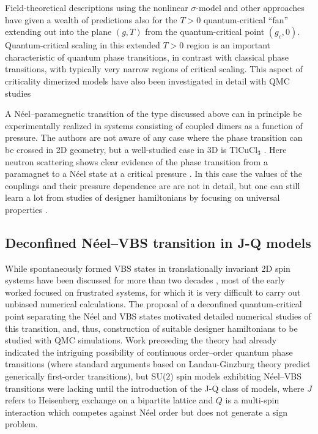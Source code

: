 \documentclass[range]{ar2e}
\begin{document}
Field-theoretical descriptions using the nonlinear $\sigma$-model \cite{Haldane83,Chakravarty89,Chubukov94} and other approaches have given a wealth of 
predictions also for the $T>0$ quantum-critical ``fan'' extending out into the plane $(g,T)$  from the quantum-critical point $(g_c,0)$. Quantum-critical
scaling in this extended $T>0$ region is an important characteristic of quantum phase transitions, in contrast with classical phase transitions, with typically 
very narrow regions of critical scaling. This aspect of criticality dimerized models have also been investigated in detail with QMC studies \cite{Sandvik95,Brenig06,Sandvik11a}

A N\'eel--paramegnetic transition of the type discussed above can in principle be experimentally realized in systems consisting of coupled dimers as a function 
of pressure. The authors are not aware of any case where the phase transition can be crossed in 2D geometry, but a well-studied case in 3D is TlCuCl$_3$ 
\cite{Cavadini01,Ruegg04}. Here neutron scattering shows clear evidence of the phase transition from a paramagnet to a N\'eel state at a critical pressure 
\cite{Ruegg08}. In this case the values of the couplings and their pressure dependence are are not in detail, but one can still learn a lot from studies 
of designer hamiltonians by focusing on universal properties \cite{Troyer97,Jin12,Oitmaa11}.

\subsection{Deconfined N\'eel--VBS transition in J-Q models}

While spontaneously formed VBS states in translationally invariant 2D spin systems have been discussed for more than two decades \cite{Chandra88,Dagotto89,Read89},
most of the early worked focused on frustrated systems, for which it is very difficult to carry out unbiased numerical calculations. The proposal of a deconfined 
quantum-critical point separating the N\'eel and VBS states motivated detailed numerical studies of this transition, and, thus, construction of suitable designer 
hamiltonians to be studied with QMC simulations. Work preceeding the theory had already indicated the intriguing possibility of continuous order--order quantum 
phase transitions (where standard arguments based on Landau-Ginzburg theory predict generically first-order transitions), but SU($2$) spin models exhibiting 
N\'eel--VBS transitions were lacking until the introduction of the J-Q class of models, where $J$ refers to Heisenberg exchange on a bipartite lattice and $Q$ is 
a multi-spin interaction which competes against N\'eel order but does not generate a sign problem. 
\end{document}
